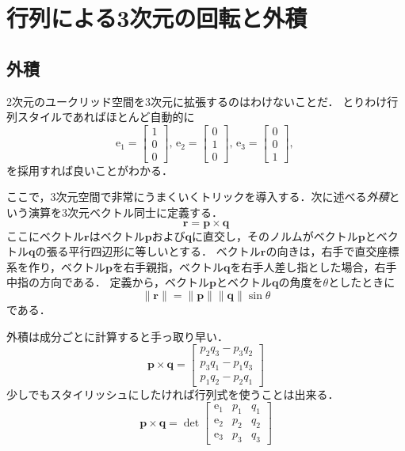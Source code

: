 \documentclass{jsbook}
\newcommand{\keyword}[1]{\emph{#1}}
\newcommand{\norm}[1]{\|{#1}\|}
\newcommand{\bvec}[1]{\boldsymbol{#1}}
\newcommand{\ve}{\mathrm{e}}
\begin{document}
\section{行列による3次元の回転と外積}

\subsection{外積}

2次元のユークリッド空間を3次元に拡張するのはわけないことだ．
とりわけ行列スタイルであればほとんど自動的に
\begin{equation}
\ve_1=\begin{bmatrix}1\\0\\0\end{bmatrix},\,
\ve_2=\begin{bmatrix}0\\1\\0\end{bmatrix},\,
\ve_3=\begin{bmatrix}0\\0\\1\end{bmatrix},\,
\end{equation}
を採用すれば良いことがわかる．

ここで，3次元空間で非常にうまくいくトリックを導入する．次に述べる\keyword{外積}という演算を3次元ベクトル同士に定義する．
\begin{equation}
\bvec{r}=\bvec{p}\times\bvec{q}
\end{equation}
ここにベクトル$\bvec{r}$はベクトル$\bvec{p}$および$\bvec{q}$に直交し，そのノルムがベクトル$\bvec{p}$とベクトル$\bvec{q}$の張る平行四辺形に等しいとする．
ベクトル$\bvec{r}$の向きは，右手で直交座標系を作り，ベクトル$\bvec{p}$を右手親指，ベクトル$\bvec{q}$を右手人差し指とした場合，右手中指の方向である．
%
%
定義から，ベクトル$\bvec{p}$とベクトル$\bvec{q}$の角度を$\theta$としたときに
\begin{equation}
\norm{\bvec{r}}=\norm{\bvec{p}}\norm{\bvec{q}}\sin\theta
\end{equation}
である．

外積は成分ごとに計算すると手っ取り早い．
\begin{equation}
\bvec{p}\times\bvec{q}=\begin{bmatrix}p_2q_3-p_3q_2\\p_3q_1-p_1q_3\\p_1q_2-p_2q_1\end{bmatrix}
\end{equation}
少しでもスタイリッシュにしたければ行列式を使うことは出来る．
\begin{equation}
\bvec{p}\times\bvec{q}=\det\begin{bmatrix}\ve_1&p_1&q_1\\\ve_2&p_2&q_2\\\ve_3&p_3&q_3\end{bmatrix}
\end{equation}
%
%
\end{document}
